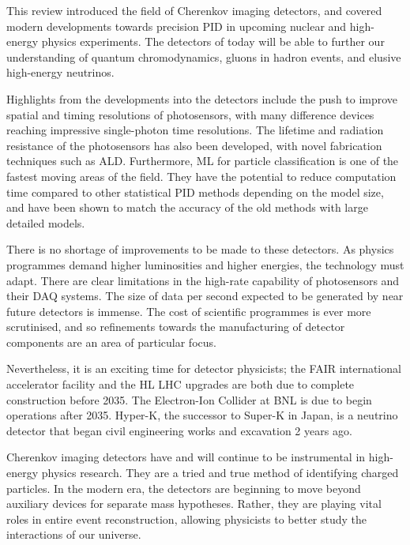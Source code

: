 
This review introduced the field of Cherenkov imaging detectors, and covered modern developments towards 
precision PID in upcoming nuclear and high-energy physics experiments. The detectors of today will be able to further our 
understanding of quantum chromodynamics, gluons in hadron events, and elusive high-energy neutrinos. 

Highlights from the developments into the detectors include the push to improve spatial and timing resolutions of photosensors, 
with many difference devices reaching impressive single-photon time resolutions. The lifetime and radiation resistance of the 
photosensors has also been developed, with novel fabrication techniques such as ALD. Furthermore, ML for particle classification 
is one of the fastest moving areas of the field. They have the potential to reduce computation time compared to other 
statistical PID methods depending on the model size, and have been shown to match the 
accuracy of the old methods with large detailed models.

There is no shortage of improvements to be made to these detectors. As physics programmes demand higher luminosities and
higher energies, the technology must adapt. There are clear limitations in the high-rate capability of photosensors and 
their DAQ systems. The size of data per second expected to be generated by near future detectors is immense. The cost
of scientific programmes is ever more scrutinised, and so refinements towards the manufacturing of detector components
are an area of particular focus.

Nevertheless, it is an exciting time for detector physicists; the FAIR international accelerator facility and the HL LHC 
upgrades are both due to complete construction before 2035. The Electron-Ion Collider at BNL is due to begin operations
after 2035. Hyper-K, the successor to Super-K in Japan, is a neutrino detector that began civil engineering works and excavation 2 years
ago. 

Cherenkov imaging detectors have and will continue to be instrumental in high-energy physics research. They are a tried 
and true method of identifying charged particles. In the modern era, the detectors are beginning to move beyond auxiliary 
devices for separate mass hypotheses. Rather, they are playing vital roles in entire event reconstruction, allowing physicists 
to better study the interactions of our universe.
